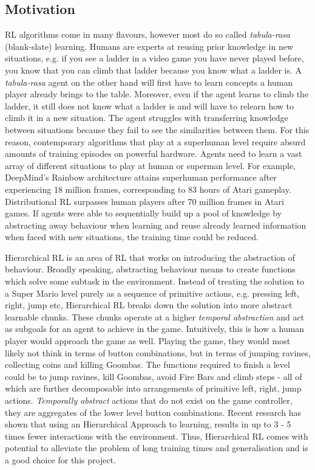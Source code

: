 \documentclass[notitlepage,a4paper,11pt]{article}
\begin{document}
\subsection{Motivation}
RL algorithms come in many flavours, however most do so called \textit{tabula-rasa} (blank-slate) learning. Humans are experts at reusing prior knowledge in new situations, e.g. if you see a ladder in a video game you have never played before, you know that you can climb that ladder because you know what a ladder is. A \textit{tabula-rasa} agent on the other hand will first have to learn concepts a human player already brings to the table. Moreover, even if the agent learns to climb the ladder, it still does not know what a ladder is and will have to relearn how to climb it in a new situation. The agent struggles with transferring knowledge between situations because they fail to see the similarities between them. For this reason, contemporary algorithms that play at a superhuman level require absurd amounts of training episodes on powerful hardware. Agents need to learn a vast array of different situations to play at human or superman level. For example, DeepMind's Rainbow architecture \cite{hessel2018rainbow} attains superhuman performance after experiencing 18 million frames, corresponding to 83 hours of Atari gameplay. Distributional RL \cite{bellemare2017distributional} surpasses human players after 70 million frames in Atari games. If agents were able to sequentially build up a pool of knowledge by abstracting away behaviour when learning and reuse already learned information when faced with new situations, the training time could be reduced. 

Hierarchical RL is an area of RL that works on introducing the abstraction of behaviour. Broadly speaking, abstracting behaviour means to create functions which solve some subtask in the environment. Instead of treating the solution to a Super Mario level purely as a sequence of primitive actions, e.g. pressing left, right, jump etc, Hierarchical RL breaks down the solution into more abstract learnable chunks. These chunks operate at a higher \textit{temporal abstraction} and act as subgoals for an agent to achieve in the game. Intuitively, this is how a human player would approach the game as well. Playing the game, they would most likely not think in terms of button combinations, but in terms of jumping ravines, collecting coins and killing Goombas. The functions required to finish a level could be to jump ravines, kill Goombas, avoid Fire Bars and climb steps - all of which are further decomposable into arrangements of primitive left, right, jump actions. \textit{Temporally abstract}  actions that do not exist on the game controller, they are aggregates of the lower level button combinations. Recent research \cite{nachum2019does} has shown that using an Hierarchical Approach to learning, results in up to 3 - 5 times fewer interactions with the environment. Thus, Hierarchical RL comes with potential to alleviate the problem of long training times and generalisation and is a good choice for this project. 
\end{document}
